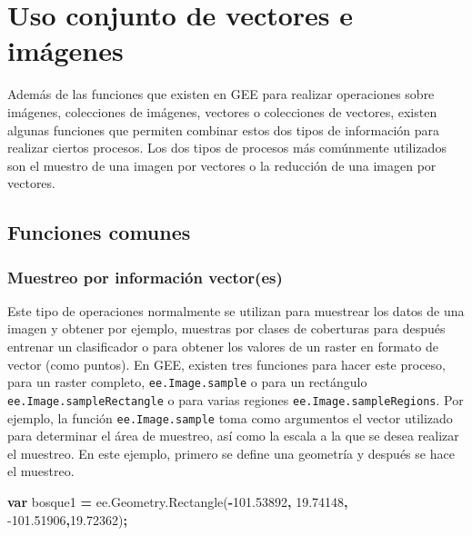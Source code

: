\documentclass[
]{article}
\newenvironment{Shaded}{\begin{snugshade}}{\end{snugshade}}
\newcommand{\AttributeTok}[1]{\textcolor[rgb]{0.77,0.63,0.00}{#1}}
\newcommand{\FloatTok}[1]{\textcolor[rgb]{0.00,0.00,0.81}{#1}}
\newcommand{\KeywordTok}[1]{\textcolor[rgb]{0.13,0.29,0.53}{\textbf{#1}}}
\newcommand{\NormalTok}[1]{#1}
\newcommand{\OperatorTok}[1]{\textcolor[rgb]{0.81,0.36,0.00}{\textbf{#1}}}
\newcommand{\VariableTok}[1]{\textcolor[rgb]{0.00,0.00,0.00}{#1}}
\begin{document}
\newpage

\hypertarget{uso-conjunto-de-vectores-e-imuxe1genes}{%
\section{Uso conjunto de vectores e
imágenes}\label{uso-conjunto-de-vectores-e-imuxe1genes}}

Además de las funciones que existen en GEE para realizar operaciones
sobre imágenes, colecciones de imágenes, vectores o colecciones de
vectores, existen algunas funciones que permiten combinar estos dos
tipos de información para realizar ciertos procesos. Los dos tipos de
procesos más comúnmente utilizados son el muestro de una imagen por
vectores o la reducción de una imagen por vectores.

\hypertarget{funciones-comunes-2}{%
\subsection{Funciones comunes}\label{funciones-comunes-2}}

\hypertarget{muestreo-por-informaciuxf3n-vectores}{%
\subsubsection{Muestreo por información
vector(es)}\label{muestreo-por-informaciuxf3n-vectores}}

Este tipo de operaciones normalmente se utilizan para muestrear los
datos de una imagen y obtener por ejemplo, muestras por clases de
coberturas para después entrenar un clasificador o para obtener los
valores de un raster en formato de vector (como puntos). En GEE, existen
tres funciones para hacer este proceso, para un raster completo,
\texttt{ee.Image.sample} o para un rectángulo
\texttt{ee.Image.sampleRectangle} o para varias regiones
\texttt{ee.Image.sampleRegions}. Por ejemplo, la función
\texttt{ee.Image.sample} toma como argumentos el vector utilizado para
determinar el área de muestreo, así como la escala a la que se desea
realizar el muestreo. En este ejemplo, primero se define una geometría y
después se hace el muestreo.

\begin{Shaded}
\begin{Highlighting}[]
\KeywordTok{var}\NormalTok{ bosque1 }\OperatorTok{=} \VariableTok{ee}\NormalTok{.}\VariableTok{Geometry}\NormalTok{.}\AttributeTok{Rectangle}\NormalTok{(}\OperatorTok{-}\FloatTok{101.53892}\OperatorTok{,} \FloatTok{19.74148}\OperatorTok{,} 
  \FloatTok{-101.51906}\OperatorTok{,}\FloatTok{19.72362}\NormalTok{)}\OperatorTok{;}
\end{Highlighting}
\end{Shaded}
\end{document}
